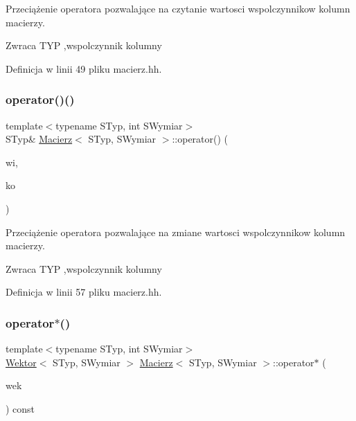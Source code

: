 Przeciążenie operatora pozwalające na czytanie wartosci wspolczynnikow kolumn macierzy.

\begin{DoxyReturn}{Zwraca}
T\+YP ,wspolczynnik kolumny 
\end{DoxyReturn}


Definicja w linii 49 pliku macierz.\+hh.

\mbox{\label{class_macierz_ad850419e7a84e1ae0f034338dbc1bdc5}} 
\subsubsection{\texorpdfstring{operator()()}{operator()()}\hspace{0.1cm}{\footnotesize\ttfamily [2/2]}}
{\footnotesize\ttfamily template$<$typename S\+Typ, int S\+Wymiar$>$ \\
S\+Typ\& \mbox{\hyperlink{class_macierz}{Macierz}}$<$ S\+Typ, S\+Wymiar $>$\+::operator() (\begin{DoxyParamCaption}\item[{int unsigned}]{wi,  }\item[{int unsigned}]{ko }\end{DoxyParamCaption})\hspace{0.3cm}{\ttfamily [inline]}}

Przeciążenie operatora pozwalające na zmiane wartosci wspolczynnikow kolumn macierzy.

\begin{DoxyReturn}{Zwraca}
T\+YP ,wspolczynnik kolumny 
\end{DoxyReturn}


Definicja w linii 57 pliku macierz.\+hh.

\mbox{\label{class_macierz_a1d27f272c4adf72f021adb08b896920a}} 
\subsubsection{\texorpdfstring{operator$\ast$()}{operator*()}}
{\footnotesize\ttfamily template$<$typename S\+Typ, int S\+Wymiar$>$ \\
\mbox{\hyperlink{class_wektor}{Wektor}}$<$ S\+Typ, S\+Wymiar $>$ \mbox{\hyperlink{class_macierz}{Macierz}}$<$ S\+Typ, S\+Wymiar $>$\+::operator$\ast$ (\begin{DoxyParamCaption}\item[{const \mbox{\hyperlink{class_wektor}{Wektor}}$<$ S\+Typ, S\+Wymiar $>$ \&}]{wek }\end{DoxyParamCaption}) const}

